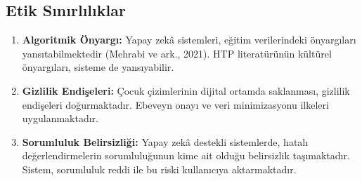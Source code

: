 \subsection{Etik Sınırlılıklar}

\begin{enumerate}
  \item \textbf{Algoritmik Önyargı:} Yapay zekâ sistemleri, eğitim verilerindeki önyargıları yansıtabilmektedir (Mehrabi ve ark., 2021). HTP literatürünün kültürel önyargıları, sisteme de yansıyabilir.

  \item \textbf{Gizlilik Endişeleri:} Çocuk çizimlerinin dijital ortamda saklanması, gizlilik endişeleri doğurmaktadır. Ebeveyn onayı ve veri minimizasyonu ilkeleri uygulanmaktadır.

  \item \textbf{Sorumluluk Belirsizliği:} Yapay zekâ destekli sistemlerde, hatalı değerlendirmelerin sorumluluğunun kime ait olduğu belirsizlik taşımaktadır. Sistem, sorumluluk reddi ile bu riski kullanıcıya aktarmaktadır.
\end{enumerate}

\newpage
